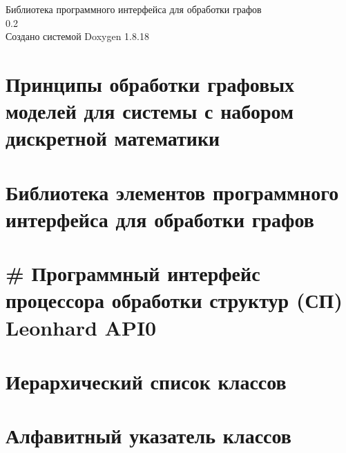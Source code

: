 \let\mypdfximage\pdfximage\def\pdfximage{\immediate\mypdfximage}\documentclass[twoside]{book}
\newcommand{\+}{\discretionary{\mbox{\scriptsize$\hookleftarrow$}}{}{}}
\newcommand{\clearemptydoublepage}{%
  \newpage{\pagestyle{empty}\cleardoublepage}%
}
\begin{document}
\hypersetup{pageanchor=false,
             bookmarksnumbered=true,
             pdfencoding=unicode
            }
\begin{titlepage}
\vspace*{7cm}
\begin{center}%
{\Large Библиотека программного интерфейса для обработки графов \\[1ex]\large 0.\+2 }\\
\vspace*{1cm}
{\large Создано системой Doxygen 1.8.18}\\
\end{center}
\end{titlepage}
\clearemptydoublepage
{}
\tableofcontents
\clearemptydoublepage
{}
\hypersetup{pageanchor=true}

\chapter{Принципы обработки графовых моделей для системы с набором дискретной математики}
\label{md_docs__xC3_x90_xC2_x93_xC3_x91_xC2_x80_xC3_x90_xC2_xB0_xC3_x91_xC2_x84_xC3_x90_xC2_xBE_xC3_x90f53e7fcf051908d6ad51fe907e366e01}

\chapter{Библиотека элементов программного интерфейса для обработки графов}
\label{md__r_e_a_d_m_e}

\chapter{\# Программный интерфейс процессора обработки структур (СП) Leonhard A\+P\+I0}
\label{md_spu-api__readme}

\chapter{Иерархический список классов}

\chapter{Алфавитный указатель классов}

\end{document}
